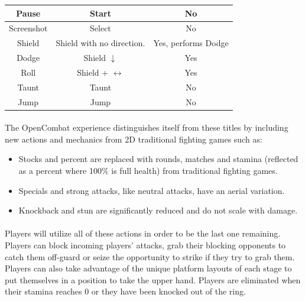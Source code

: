 \begin{table}[h!]
\begin{tabular}{ | c | c | c | }
    \hline
    Pause                                                                & Start                                & No                    \\
    \hline
    Screenshot                                                           & Select                               & No                    \\
    \hline
    Shield                                                               & Shield with no direction.            & Yes, performs Dodge   \\
    \hline
    Dodge                                                                & Shield $\downarrow$                           & Yes                   \\
    \hline
    Roll                                                                 & Shield + $\leftrightarrow$  & Yes                   \\
    \hline
    Taunt                                                                & Taunt                                & No \\                  
    \hline
    Jump & Jump & No \\
    \hline
\end{tabular}
\end{table}

\pagebreak

\paragraph{} The OpenCombat experience distinguishes itself from these titles by including new actions and mechanics from 2D traditional fighting games such as:

\begin{itemize}
    \item Stocks and percent are replaced with rounds, matches and stamina (reflected as a percent where 100\% is full health) from traditional fighting games.
    \item Specials and strong attacks, like neutral attacks, have an aerial variation.
    \item Knockback and stun are significantly reduced and do not scale with damage.
\end{itemize}

\paragraph{} Players will utilize all of these actions in order to be the last one remaining. Players can block incoming players' attacks, grab their blocking opponents to catch them off-guard or seize the opportunity to strike if they try to grab them. Players can also take advantage of the unique platform layouts of each stage to put themselves in a position to take the upper hand. Players are eliminated when their stamina reaches 0 or they have been knocked out of the ring.

